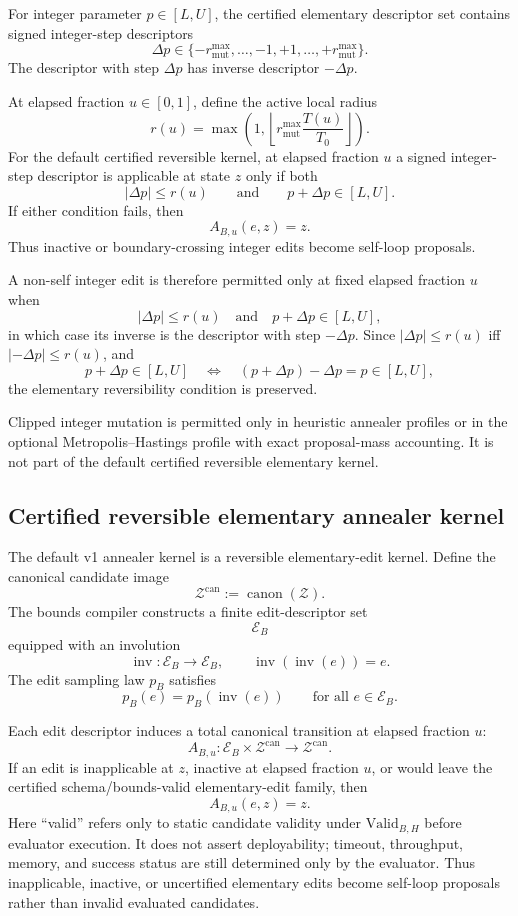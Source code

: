 \documentclass[11pt]{article}
\begin{document}
For integer parameter $p\in[L,U]$, the certified elementary descriptor set
contains signed integer-step descriptors
\[
\Delta p\in
\{-r_{\mathrm{mut}}^{\max},\ldots,-1,+1,\ldots,+r_{\mathrm{mut}}^{\max}\}.
\]
The descriptor with step $\Delta p$ has inverse descriptor $-\Delta p$.

At elapsed fraction $u\in[0,1]$, define the active local radius
\[
r(u)=
\max\!\left(
1,
\left\lfloor
r_{\mathrm{mut}}^{\max}\frac{T(u)}{T_0}
\right\rfloor
\right).
\]
For the default certified reversible kernel, at elapsed fraction $u$ a signed
integer-step descriptor is applicable at state $z$ only if both
\[
|\Delta p|\le r(u)
\qquad\text{and}\qquad
p+\Delta p\in[L,U].
\]
If either condition fails, then
\[
A_{B,u}(e,z)=z.
\]
Thus inactive or boundary-crossing integer edits become self-loop proposals.

A non-self integer edit is therefore permitted only at fixed elapsed fraction
$u$ when
\[
|\Delta p|\le r(u)
\quad\text{and}\quad
p+\Delta p\in[L,U],
\]
in which case its inverse is the descriptor with step $-\Delta p$. Since
$|\Delta p|\le r(u)$ iff $|-\Delta p|\le r(u)$, and
\[
p+\Delta p\in[L,U]
\quad\Longleftrightarrow\quad
(p+\Delta p)-\Delta p=p\in[L,U],
\]
the elementary reversibility condition is preserved.

Clipped integer mutation is permitted only in heuristic annealer profiles or
in the optional Metropolis--Hastings profile with exact proposal-mass
accounting. It is not part of the default certified reversible elementary
kernel.

\subsection{Certified reversible elementary annealer kernel}
\label{sec:reversible-annealer-kernel}

The default v1 annealer kernel is a reversible elementary-edit kernel. Define
the canonical candidate image
\[
\mathcal{Z}^{\mathrm{can}}:=\operatorname{canon}(\mathcal{Z}).
\]
The bounds compiler constructs a finite edit-descriptor set
\[
\mathcal{E}_B
\]
equipped with an involution
\[
\operatorname{inv}:\mathcal{E}_B\to\mathcal{E}_B,
\qquad
\operatorname{inv}(\operatorname{inv}(e))=e.
\]
The edit sampling law $p_B$ satisfies
\[
p_B(e)=p_B(\operatorname{inv}(e))
\qquad\text{for all }e\in\mathcal{E}_B.
\]

Each edit descriptor induces a total canonical transition at elapsed fraction
$u$:
\[
A_{B,u}:\mathcal{E}_B\times\mathcal{Z}^{\mathrm{can}}
\to
\mathcal{Z}^{\mathrm{can}}.
\]
If an edit is inapplicable at $z$, inactive at elapsed fraction $u$, or would
leave the certified schema/bounds-valid elementary-edit family, then
\[
A_{B,u}(e,z)=z.
\]
Here ``valid'' refers only to static candidate validity under
$\mathrm{Valid}_{B,H}$ before evaluator execution. It does not assert
deployability; timeout, throughput, memory, and success status are still
determined only by the evaluator.
Thus inapplicable, inactive, or uncertified elementary edits become self-loop
proposals rather than invalid evaluated candidates.
\end{document}
